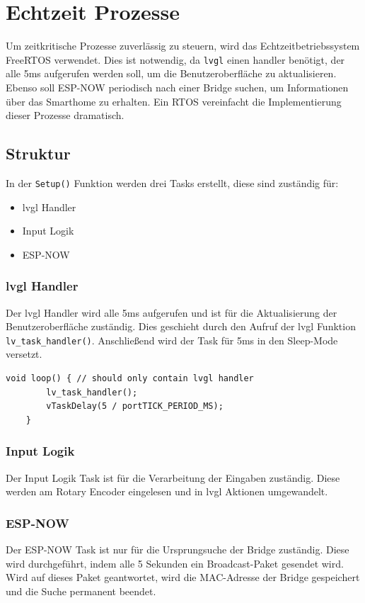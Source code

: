 \section{Echtzeit Prozesse}
Um zeitkritische Prozesse zuverlässig zu steuern, wird das Echtzeitbetriebssystem
FreeRTOS verwendet. Dies ist notwendig, da \texttt{lvgl} einen handler benötigt,
der alle 5ms aufgerufen werden soll, um die Benutzeroberfläche zu aktualisieren.
Ebenso soll ESP-NOW periodisch nach einer Bridge suchen, um Informationen 
über das Smarthome zu erhalten. Ein RTOS vereinfacht die Implementierung
dieser Prozesse dramatisch.

    \subsection{Struktur}
    In der \texttt{Setup()} Funktion werden drei Tasks erstellt, diese sind 
    zuständig für: 
    \begin{itemize}
        \item lvgl Handler
        \item Input Logik
        \item ESP-NOW
    \end{itemize}

        \subsubsection{lvgl Handler}
        Der lvgl Handler wird alle 5ms aufgerufen und ist für die Aktualisierung
        der Benutzeroberfläche zuständig. Dies geschieht durch den Aufruf
        der lvgl Funktion \texttt{lv\_task\_handler()}. Anschließend wird der 
        Task für 5ms in den Sleep-Mode versetzt.
        \begin{lstlisting}[style=cppCode]
    void loop() { // should only contain lvgl handler
        lv_task_handler();
        vTaskDelay(5 / portTICK_PERIOD_MS);
    }
            \end{lstlisting}

        \subsubsection{Input Logik}
        Der Input Logik Task ist für die Verarbeitung der Eingaben zuständig.
        Diese werden am Rotary Encoder eingelesen und in lvgl Aktionen umgewandelt.

        \subsubsection{ESP-NOW}
        Der ESP-NOW Task ist nur für die Ursprungsuche der Bridge zuständig.
        Diese wird durchgeführt, indem alle 5 Sekunden ein Broadcast-Paket
        gesendet wird. Wird auf dieses Paket geantwortet, wird die 
        MAC-Adresse der Bridge gespeichert und die Suche permanent beendet.

